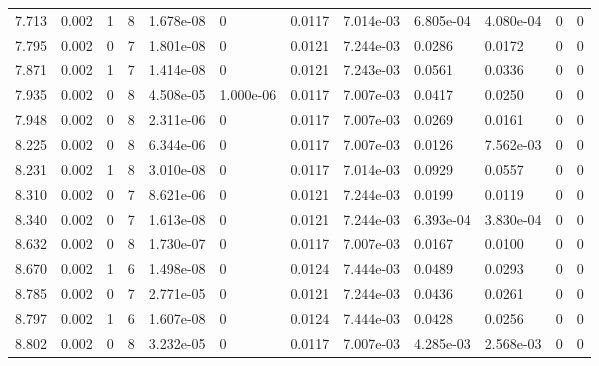 \documentclass[preview]{standalone}
\begin{document}
{{{\begin{tabular}{L{1.2cm}C{1.2cm} C{0.3cm}C{0.5cm} C{1.4cm}C{1.4cm} C{1.4cm}C{1.4cm} C{1.6cm}C{1.6cm} C{1.6cm}C{1.6cm}}
  7.713  &  0.002  & 1     &  8 &  1.678e-08  & 0  &  0.0117&   7.014e-03& 6.805e-04 & 4.080e-04   &  0 & 0  \\ 
  7.795  &  0.002  & 0     &  7 &  1.801e-08  & 0  &  0.0121&   7.244e-03& 0.0286 & 0.0172   &  0 & 0  \\ 
  7.871  &  0.002  & 1     &  7 &  1.414e-08  & 0  &  0.0121&   7.243e-03& 0.0561 & 0.0336   &  0 & 0  \\ 
  7.935  &  0.002  & 0     &  8 &  4.508e-05  & 1.000e-06  &  0.0117&   7.007e-03& 0.0417 & 0.0250   &  0 & 0  \\ 
  7.948  &  0.002  & 0     &  8 &  2.311e-06  & 0  &  0.0117&   7.007e-03& 0.0269 & 0.0161   &  0 & 0  \\ 
  8.225  &  0.002  & 0     &  8 &  6.344e-06  & 0  &  0.0117&   7.007e-03& 0.0126 & 7.562e-03   &  0 & 0  \\ 
  8.231  &  0.002  & 1     &  8 &  3.010e-08  & 0  &  0.0117&   7.014e-03& 0.0929 & 0.0557   &  0 & 0  \\ 
  8.310  &  0.002  & 0     &  7 &  8.621e-06  & 0  &  0.0121&   7.244e-03& 0.0199 & 0.0119   &  0 & 0  \\ 
  8.340  &  0.002  & 0     &  7 &  1.613e-08  & 0  &  0.0121&   7.244e-03& 6.393e-04 & 3.830e-04   &  0 & 0  \\ 
  8.632  &  0.002  & 0     &  8 &  1.730e-07  & 0  &  0.0117&   7.007e-03& 0.0167 & 0.0100   &  0 & 0  \\ 
  8.670  &  0.002  & 1     &  6 &  1.498e-08  & 0  &  0.0124&   7.444e-03& 0.0489 & 0.0293   &  0 & 0  \\ 
  8.785  &  0.002  & 0     &  7 &  2.771e-05  & 0  &  0.0121&   7.244e-03& 0.0436 & 0.0261   &  0 & 0  \\ 
  8.797  &  0.002  & 1     &  6 &  1.607e-08  & 0  &  0.0124&   7.444e-03& 0.0428 & 0.0256   &  0 & 0  \\ 
  8.802  &  0.002  & 0     &  8 &  3.232e-05  & 0  &  0.0117&   7.007e-03& 4.285e-03 & 2.568e-03   &  0 & 0  \\ 
\hline 
\end{tabular} 

}}}
\end{document}
